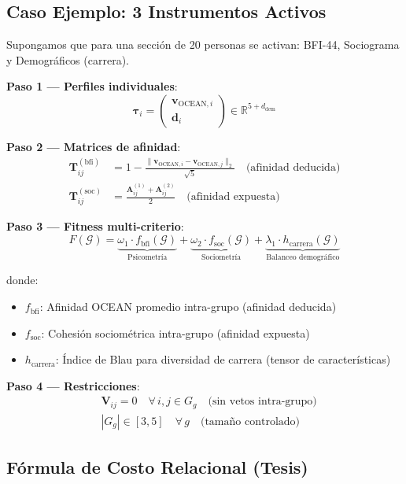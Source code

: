 \documentclass[12pt,a4paper]{article}
\begin{document}
\subsection{Caso Ejemplo: 3 Instrumentos Activos}

Supongamos que para una sección de 20 personas se activan: BFI-44, Sociograma y Demográficos (carrera).

\textbf{Paso 1 --- Perfiles individuales}:
\[
\boldsymbol{\tau}_i = \begin{pmatrix} \mathbf{v}_{\text{OCEAN},i} \\ \mathbf{d}_i \end{pmatrix} \in \mathbb{R}^{5 + d_{\text{dem}}}
\]

\textbf{Paso 2 --- Matrices de afinidad}:
\begin{align}
    \mathbf{T}^{(\text{bfi})}_{ij} &= 1 - \frac{\|\mathbf{v}_{\text{OCEAN},i} - \mathbf{v}_{\text{OCEAN},j}\|_2}{\sqrt{5}} \quad \text{(afinidad deducida)} \\
    \mathbf{T}^{(\text{soc})}_{ij} &= \frac{\mathbf{A}^{(1)}_{ij} + \mathbf{A}^{(2)}_{ij}}{2} \quad \text{(afinidad expuesta)}
\end{align}

\textbf{Paso 3 --- Fitness multi-criterio}:
\[
F(\mathcal{G}) = \underbrace{\omega_1 \cdot f_{\text{bfi}}(\mathcal{G})}_{\text{Psicometría}} + \underbrace{\omega_2 \cdot f_{\text{soc}}(\mathcal{G})}_{\text{Sociometría}} + \underbrace{\lambda_1 \cdot h_{\text{carrera}}(\mathcal{G})}_{\text{Balanceo demográfico}}
\]

donde:
\begin{itemize}
    \item $f_{\text{bfi}}$: Afinidad OCEAN promedio intra-grupo (afinidad deducida)
    \item $f_{\text{soc}}$: Cohesión sociométrica intra-grupo (afinidad expuesta)
    \item $h_{\text{carrera}}$: Índice de Blau para diversidad de carrera (tensor de características)
\end{itemize}

\textbf{Paso 4 --- Restricciones}:
\begin{align}
    & \mathbf{V}_{ij} = 0 \quad \forall\, i, j \in G_g \quad \text{(sin vetos intra-grupo)} \\
    & |G_g| \in [3, 5] \quad \forall\, g \quad \text{(tamaño controlado)}
\end{align}

\subsection{Fórmula de Costo Relacional (Tesis)}
\end{document}

